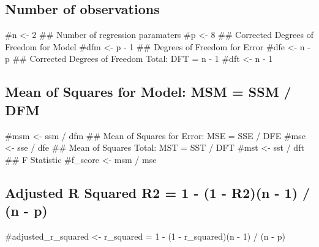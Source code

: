 \documentclass[
]{article}
\begin{document}
\hypertarget{number-of-observations}{%
\subsection{Number of observations}\label{number-of-observations}}

\#n \textless- 2 \#\# Number of regression paramaters \#p \textless- 8
\#\# Corrected Degrees of Freedom for Model \#dfm \textless- p - 1 \#\#
Degrees of Freedom for Error \#dfe \textless- n - p \#\# Corrected
Degrees of Freedom Total: DFT = n - 1 \#dft \textless- n - 1

\hypertarget{mean-of-squares-for-model-msm-ssm-dfm}{%
\subsection{Mean of Squares for Model: MSM = SSM /
DFM}\label{mean-of-squares-for-model-msm-ssm-dfm}}

\#msm \textless- ssm / dfm \#\# Mean of Squares for Error: MSE = SSE /
DFE \#mse \textless- sse / dfe \#\# Mean of Squares Total: MST = SST /
DFT \#mst \textless- sst / dft \#\# F Statistic \#f\_score \textless-
msm / mse

\hypertarget{adjusted-r-squared-r2-1---1---r2n---1-n---p}{%
\subsection{Adjusted R Squared R2 = 1 - (1 - R2)(n - 1) / (n -
p)}\label{adjusted-r-squared-r2-1---1---r2n---1-n---p}}

\#adjusted\_r\_squared \textless- r\_squared = 1 - (1 - r\_squared)(n -
1) / (n - p)
\end{document}
